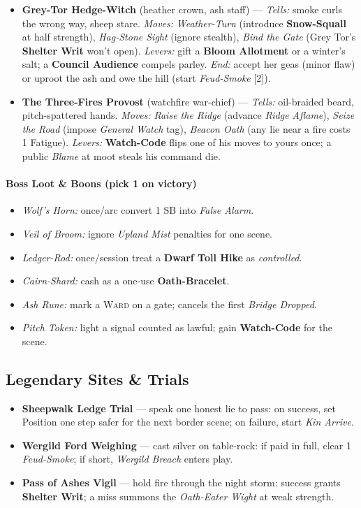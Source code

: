 \begin{itemize}
  \item \textbf{Grey-Tor Hedge-Witch} (heather crown, ash staff) --- \emph{Tells:} smoke curls the wrong way, sheep stare. \emph{Moves:} \emph{Weather-Turn} (introduce \textbf{Snow-Squall} at half strength), \emph{Hag-Stone Sight} (ignore stealth), \emph{Bind the Gate} (Grey Tor’s \textbf{Shelter Writ} won’t open). \emph{Levers:} gift a \textbf{Bloom Allotment} or a winter’s salt; a \textbf{Council Audience} compels parley. \emph{End:} accept her geas (minor flaw) or uproot the ash and owe the hill (start \emph{Feud-Smoke} [2]).
  \item \textbf{The Three-Fires Provost} (watchfire war-chief) --- \emph{Tells:} oil-braided beard, pitch-spattered hands. \emph{Moves:} \emph{Raise the Ridge} (advance \emph{Ridge Aflame}), \emph{Seize the Road} (impose \emph{General Watch} tag), \emph{Beacon Oath} (any lie near a fire costs 1 Fatigue). \emph{Levers:} \textbf{Watch-Code} flips one of his moves to yours once; a public \emph{Blame} at moot steals his command die.
\end{itemize}

\paragraph*{Boss Loot \& Boons (pick 1 on victory)}
\begin{itemize}
  \item \emph{Wolf’s Horn:} once/arc convert 1 SB into \emph{False Alarm}.
  \item \emph{Veil of Broom:} ignore \emph{Upland Mist} penalties for one scene.
  \item \emph{Ledger-Rod:} once/session treat a \textbf{Dwarf Toll Hike} as \emph{controlled}.
  \item \emph{Cairn-Shard:} cash as a one-use \textbf{Oath-Bracelet}.
  \item \emph{Ash Rune:} mark a \textsc{Ward} on a gate; cancels the first \emph{Bridge Dropped}.
  \item \emph{Pitch Token:} light a signal counted as lawful; gain \textbf{Watch-Code} for the scene.
\end{itemize}

\subsection*{Legendary Sites \& Trials}
\begin{itemize}
  \item \textbf{Sheepwalk Ledge Trial} --- speak one honest lie to pass: on success, set Position one step safer for the next border scene; on failure, start \emph{Kin Arrive}.
  \item \textbf{Wergild Ford Weighing} --- cast silver on table-rock: if paid in full, clear 1 \emph{Feud-Smoke}; if short, \emph{Wergild Breach} enters play.
  \item \textbf{Pass of Ashes Vigil} --- hold fire through the night storm: success grants \textbf{Shelter Writ}; a miss summons the \emph{Oath-Eater Wight} at weak strength.
\end{itemize}

